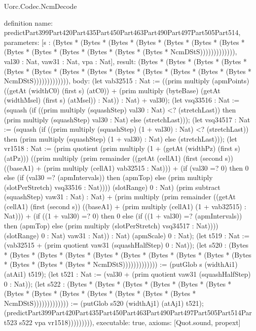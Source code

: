 \begin{lexlean}{Uorc.Codec.NcmDecode}
\begin{semanticmodule}
definition{
  name: predictPart399Part420Part435Part450Part463Part490Part497Part505Part514,
  parameters: [s : (Bytes * (Bytes * (Bytes * (Bytes * (Bytes * (Bytes * (Bytes * (Bytes * (Bytes * (Bytes * (Bytes * (Bytes * (Bytes * NcmDStS))))))))))))), val30 : Nat, vaw31 : Nat, vpa : Nat],
  result: (Bytes * (Bytes * (Bytes * (Bytes * (Bytes * (Bytes * (Bytes * (Bytes * (Bytes * (Bytes * (Bytes * (Bytes * (Bytes * NcmDStS))))))))))))),
  body: (let vab32515 : Nat := ((prim multiply (apmPoints) ((getAt (widthC0) (first s) (atC0)) + (prim multiply (byteBase) (getAt (widthMsel) (first s) (atMsel)) : Nat)) : Nat) + val30); (let vsq33516 : Nat := (squash (if ((prim multiply (squashStep) val30 : Nat) <? (stretchLast)) then (prim multiply (squashStep) val30 : Nat) else (stretchLast))); (let vsq34517 : Nat := (squash (if ((prim multiply (squashStep) (1 + val30) : Nat) <? (stretchLast)) then (prim multiply (squashStep) (1 + val30) : Nat) else (stretchLast))); (let vr1518 : Nat := (prim quotient (prim multiply (1 + (getAt (widthPz) (first s) (atPz))) ((prim multiply (prim remainder ((getAt (cellA1) (first (second s)) ((baseA1) + (prim multiply (cellA1) vab32515 : Nat))) + (if (val30 =? 0) then 0 else (if (val30 =? (apmIntervals)) then (apmTop) else (prim multiply (slotPerStretch) vsq33516 : Nat)))) (slotRange) 0 : Nat) (prim subtract (squashStep) vaw31 : Nat) : Nat) + (prim multiply (prim remainder ((getAt (cellA1) (first (second s)) ((baseA1) + (prim multiply (cellA1) (1 + vab32515) : Nat))) + (if ((1 + val30) =? 0) then 0 else (if ((1 + val30) =? (apmIntervals)) then (apmTop) else (prim multiply (slotPerStretch) vsq34517 : Nat)))) (slotRange) 0 : Nat) vaw31 : Nat)) : Nat) (apmScale) 0 : Nat); (let t519 : Nat := (vab32515 + (prim quotient vaw31 (squashHalfStep) 0 : Nat)); (let s520 : (Bytes * (Bytes * (Bytes * (Bytes * (Bytes * (Bytes * (Bytes * (Bytes * (Bytes * (Bytes * (Bytes * (Bytes * (Bytes * NcmDStS))))))))))))) := (putGlob s (widthAi1) (atAi1) t519); (let t521 : Nat := (val30 + (prim quotient vaw31 (squashHalfStep) 0 : Nat)); (let s522 : (Bytes * (Bytes * (Bytes * (Bytes * (Bytes * (Bytes * (Bytes * (Bytes * (Bytes * (Bytes * (Bytes * (Bytes * (Bytes * NcmDStS))))))))))))) := (putGlob s520 (widthAj1) (atAj1) t521); (predictPart399Part420Part435Part450Part463Part490Part497Part505Part514Part523 s522 vpa vr1518))))))))),
  executable: true,
  axioms: [Quot.sound, propext]
}


\end{semanticmodule}
\end{lexlean}
